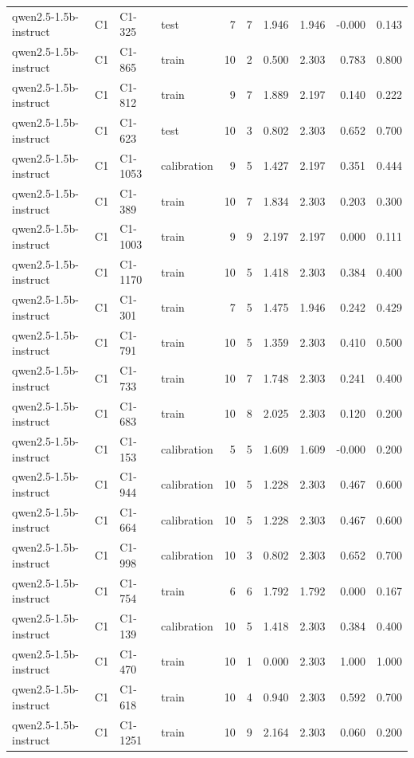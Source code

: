 \begin{table}
\begin{tabular}{llllrrrrrr}
qwen2.5-1.5b-instruct & C1 & C1-325 & test & 7 & 7 & 1.946 & 1.946 & -0.000 & 0.143 \\
qwen2.5-1.5b-instruct & C1 & C1-865 & train & 10 & 2 & 0.500 & 2.303 & 0.783 & 0.800 \\
qwen2.5-1.5b-instruct & C1 & C1-812 & train & 9 & 7 & 1.889 & 2.197 & 0.140 & 0.222 \\
qwen2.5-1.5b-instruct & C1 & C1-623 & test & 10 & 3 & 0.802 & 2.303 & 0.652 & 0.700 \\
qwen2.5-1.5b-instruct & C1 & C1-1053 & calibration & 9 & 5 & 1.427 & 2.197 & 0.351 & 0.444 \\
qwen2.5-1.5b-instruct & C1 & C1-389 & train & 10 & 7 & 1.834 & 2.303 & 0.203 & 0.300 \\
qwen2.5-1.5b-instruct & C1 & C1-1003 & train & 9 & 9 & 2.197 & 2.197 & 0.000 & 0.111 \\
qwen2.5-1.5b-instruct & C1 & C1-1170 & train & 10 & 5 & 1.418 & 2.303 & 0.384 & 0.400 \\
qwen2.5-1.5b-instruct & C1 & C1-301 & train & 7 & 5 & 1.475 & 1.946 & 0.242 & 0.429 \\
qwen2.5-1.5b-instruct & C1 & C1-791 & train & 10 & 5 & 1.359 & 2.303 & 0.410 & 0.500 \\
qwen2.5-1.5b-instruct & C1 & C1-733 & train & 10 & 7 & 1.748 & 2.303 & 0.241 & 0.400 \\
qwen2.5-1.5b-instruct & C1 & C1-683 & train & 10 & 8 & 2.025 & 2.303 & 0.120 & 0.200 \\
qwen2.5-1.5b-instruct & C1 & C1-153 & calibration & 5 & 5 & 1.609 & 1.609 & -0.000 & 0.200 \\
qwen2.5-1.5b-instruct & C1 & C1-944 & calibration & 10 & 5 & 1.228 & 2.303 & 0.467 & 0.600 \\
qwen2.5-1.5b-instruct & C1 & C1-664 & calibration & 10 & 5 & 1.228 & 2.303 & 0.467 & 0.600 \\
qwen2.5-1.5b-instruct & C1 & C1-998 & calibration & 10 & 3 & 0.802 & 2.303 & 0.652 & 0.700 \\
qwen2.5-1.5b-instruct & C1 & C1-754 & train & 6 & 6 & 1.792 & 1.792 & 0.000 & 0.167 \\
qwen2.5-1.5b-instruct & C1 & C1-139 & calibration & 10 & 5 & 1.418 & 2.303 & 0.384 & 0.400 \\
qwen2.5-1.5b-instruct & C1 & C1-470 & train & 10 & 1 & 0.000 & 2.303 & 1.000 & 1.000 \\
qwen2.5-1.5b-instruct & C1 & C1-618 & train & 10 & 4 & 0.940 & 2.303 & 0.592 & 0.700 \\
qwen2.5-1.5b-instruct & C1 & C1-1251 & train & 10 & 9 & 2.164 & 2.303 & 0.060 & 0.200 \\

\end{tabular}
\end{table}
